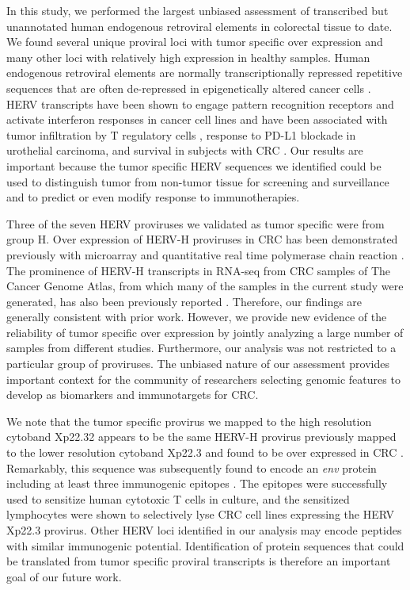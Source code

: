 In this study, we performed the largest unbiased assessment of transcribed but unannotated human endogenous retroviral elements in colorectal tissue to date.
We found several unique proviral loci with tumor specific over expression and many other loci with relatively high expression in healthy samples.
Human endogenous retroviral elements are normally transcriptionally repressed repetitive sequences that are often de-repressed in epigenetically altered cancer cells \citep{Babaian2016}.
HERV transcripts have been shown to engage pattern recognition receptors and activate interferon responses in cancer cell lines \citep{Chiappinelli2015, Roulois2015} and have been associated with tumor infiltration by T regulatory cells \citep{Desai2017}, response to PD-L1 blockade in urothelial carcinoma, and survival in subjects with CRC \citep{Solovyov2018}.
Our results are important because the tumor specific HERV sequences we identified could be used to distinguish tumor from non-tumor tissue for screening and surveillance and to predict or even modify response to immunotherapies.

Three of the seven HERV proviruses we validated as tumor specific were from group H.
Over expression of HERV-H proviruses in CRC has been demonstrated previously with microarray \citep{Perot2012} and quantitative real time polymerase chain reaction \citep{Perot2015}.
The prominence of HERV-H transcripts in RNA-seq from CRC samples of The Cancer Genome Atlas, from which many of the samples in the current study were generated, has also been previously reported \citep{Desai2017, Attig2019}.
Therefore, our findings are generally consistent with prior work.
However, we provide new evidence of the reliability of tumor specific over expression by jointly analyzing a large number of samples from different studies.
Furthermore, our analysis was not restricted to a particular group of proviruses.
The unbiased nature of our assessment provides important context for the community of researchers selecting genomic features to develop as biomarkers and immunotargets for CRC.

We note that the tumor specific provirus we mapped to the high resolution cytoband Xp22.32 appears to be the same HERV-H provirus previously mapped to the lower resolution cytoband Xp22.3 and found to be over expressed in CRC \citep{Wentzensen2007}.
Remarkably, this sequence was subsequently found to encode an \emph{env} protein including at least three immunogenic epitopes \citep{Mullins2012}.
The epitopes were successfully used to sensitize human cytotoxic T cells in culture, and the sensitized lymphocytes were shown to selectively lyse CRC cell lines expressing the HERV Xp22.3 provirus.
Other HERV loci identified in our analysis may encode peptides with similar immunogenic potential.
Identification of protein sequences that could be translated from tumor specific proviral transcripts is therefore an important goal of our future work.

